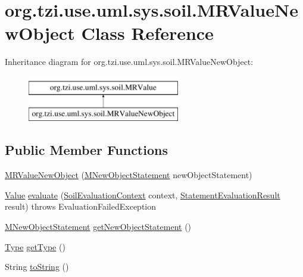 \hypertarget{classorg_1_1tzi_1_1use_1_1uml_1_1sys_1_1soil_1_1_m_r_value_new_object}{\section{org.\-tzi.\-use.\-uml.\-sys.\-soil.\-M\-R\-Value\-New\-Object Class Reference}
\label{classorg_1_1tzi_1_1use_1_1uml_1_1sys_1_1soil_1_1_m_r_value_new_object}
}
Inheritance diagram for org.\-tzi.\-use.\-uml.\-sys.\-soil.\-M\-R\-Value\-New\-Object\-:\begin{figure}[H]
\begin{center}
\leavevmode
\includegraphics[height=2.000000cm]{classorg_1_1tzi_1_1use_1_1uml_1_1sys_1_1soil_1_1_m_r_value_new_object}
\end{center}
\end{figure}
\subsection*{Public Member Functions}
\begin{DoxyCompactItemize}
\item 
\hyperlink{classorg_1_1tzi_1_1use_1_1uml_1_1sys_1_1soil_1_1_m_r_value_new_object_a1ae8f64dde207529f4ca3074ff613e61}{M\-R\-Value\-New\-Object} (\hyperlink{classorg_1_1tzi_1_1use_1_1uml_1_1sys_1_1soil_1_1_m_new_object_statement}{M\-New\-Object\-Statement} new\-Object\-Statement)
\item 
\hyperlink{classorg_1_1tzi_1_1use_1_1uml_1_1ocl_1_1value_1_1_value}{Value} \hyperlink{classorg_1_1tzi_1_1use_1_1uml_1_1sys_1_1soil_1_1_m_r_value_new_object_a13b9a732ec0103b19555891b925f5e7c}{evaluate} (\hyperlink{classorg_1_1tzi_1_1use_1_1uml_1_1sys_1_1soil_1_1_soil_evaluation_context}{Soil\-Evaluation\-Context} context, \hyperlink{classorg_1_1tzi_1_1use_1_1uml_1_1sys_1_1_statement_evaluation_result}{Statement\-Evaluation\-Result} result)  throws Evaluation\-Failed\-Exception 
\item 
\hyperlink{classorg_1_1tzi_1_1use_1_1uml_1_1sys_1_1soil_1_1_m_new_object_statement}{M\-New\-Object\-Statement} \hyperlink{classorg_1_1tzi_1_1use_1_1uml_1_1sys_1_1soil_1_1_m_r_value_new_object_aebaf7ef6db105ba4a1a94671830001d4}{get\-New\-Object\-Statement} ()
\item 
\hyperlink{interfaceorg_1_1tzi_1_1use_1_1uml_1_1ocl_1_1type_1_1_type}{Type} \hyperlink{classorg_1_1tzi_1_1use_1_1uml_1_1sys_1_1soil_1_1_m_r_value_new_object_a47031084d42cdbd4fd54b4b97ab0d752}{get\-Type} ()
\item 
String \hyperlink{classorg_1_1tzi_1_1use_1_1uml_1_1sys_1_1soil_1_1_m_r_value_new_object_a8024fab5fb0a62b1744448f6eb57c831}{to\-String} ()
\end{DoxyCompactItemize}



